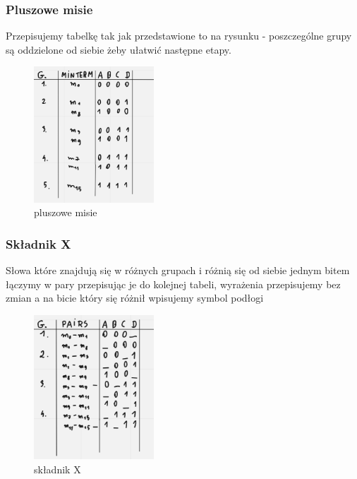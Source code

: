 \newpage

\subsubsection{Pluszowe misie}

Przepisujemy tabelkę tak jak przedstawione to na rysunku - poszczególne grupy są oddzielone od siebie żeby ułatwić następne etapy.

\begin{figure}[h!]
    \centering
    \includegraphics[width=0.4\textwidth]{images/qmc/qmc_1.png}
    \caption{pluszowe misie}
    \label{fig:my_label}
\end{figure}

\subsubsection{Składnik X}

Słowa które znajdują się w różnych grupach i różnią się od siebie jednym bitem łączymy w pary przepisując je do kolejnej tabeli, wyrażenia przepisujemy bez zmian a na bicie który się różnił wpisujemy symbol podłogi

\begin{figure}[h!]
    \centering
    \includegraphics[width=0.4\textwidth]{images/qmc/qmc_2.png}
    \caption{składnik X}
    \label{fig:my_label}
\end{figure}

